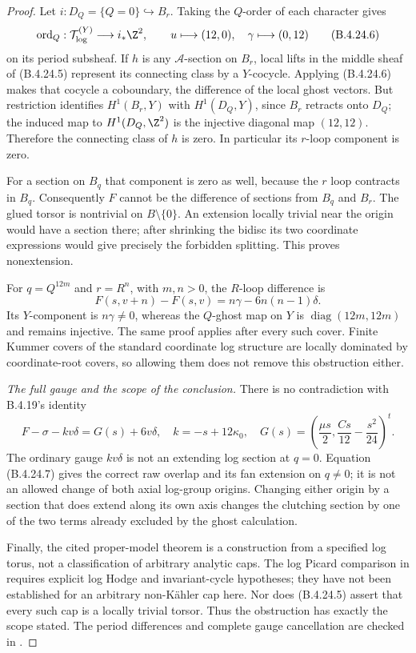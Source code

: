 \begin{proof}
Let $i:D_Q=\{Q=0\}\hookrightarrow B_r$.
Taking the $Q$-order of each character gives
\[
 \operatorname{ord}_Q:
 \mathcal T_{\log}^{(Y)}\longrightarrow i_*\Z^2,
 \qquad
 u\longmapsto(12,0),\quad
 \gamma\longmapsto(0,12)
 \tag{B.4.24.6}
\]
on its period subsheaf. If $h$ is any
$\mathcal A$-section on $B_r$, local lifts in
the middle sheaf of (B.4.24.5) represent its
connecting class by a $Y$-cocycle. Applying
(B.4.24.6) makes that cocycle a coboundary,
the difference of the local ghost vectors.
But restriction identifies $H^1(B_r,Y)$ with
$H^1(D_Q,Y)$, since $B_r$ retracts onto $D_Q$;
the induced map to $H^1(D_Q,\Z^2)$ is the
injective diagonal map $(12,12)$. Therefore
the connecting class of $h$ is zero. In
particular its $r$-loop component is zero.

For a section on $B_q$ that component is zero
as well, because the $r$ loop contracts in $B_q$.
Consequently $F$ cannot be the difference of
sections from $B_q$ and $B_r$. The glued torsor
is nontrivial on $B\setminus\{0\}$. An extension
locally trivial near the origin would have a
section there; after shrinking the bidisc its
two coordinate expressions would give precisely
the forbidden splitting. This proves nonextension.

For $q=Q^{12m}$ and $r=R^n$, with $m,n>0$,
the $R$-loop difference is
\[
 F(s,v+n)-F(s,v)
    =n\gamma-6n(n-1)\delta.
\]
Its $Y$-component is $n\gamma\ne0$,
whereas the $Q$-ghost map on $Y$ is
$\operatorname{diag}(12m,12m)$ and remains
injective. The same proof applies after every
such cover. Finite Kummer covers of the standard
coordinate log structure are locally dominated
by coordinate-root covers, so allowing them
does not remove this obstruction either.

\emph{The full gauge and the scope of the conclusion.}
There is no contradiction with B.4.19's identity
\[
 F-\sigma-kv\delta=G(s)+6v\delta,
 \quad k=-s+12\kappa_0,
 \quad G(s)=\left(\frac{\mu s}2,
                  \frac{Cs}{12}-\frac{s^2}{24}\right)^t.
 \tag{B.4.24.7}
\]
The ordinary gauge $kv\delta$ is not an extending
log section at $q=0$. Equation (B.4.24.7) gives
the correct raw overlap and its fan extension
on $q\ne0$; it is not an allowed change of
both axial log-group origins. Changing either
origin by a section that does extend along its
own axis changes the clutching section by one
of the two terms already excluded by the
ghost calculation.

Finally, the cited proper-model theorem is a
construction from a specified log torus, not
a classification of arbitrary analytic caps.
The log Picard comparison in
\citet[Sections 7--9]{KKN2008PicardE} requires
explicit log Hodge and invariant-cycle hypotheses;
they have not been established for an arbitrary
non-K\"ahler cap here. Nor does (B.4.24.5)
assert that every such cap is a locally trivial
torsor. Thus the obstruction has exactly the
scope stated. The period differences and complete
gauge cancellation are checked in
.
\end{proof}
